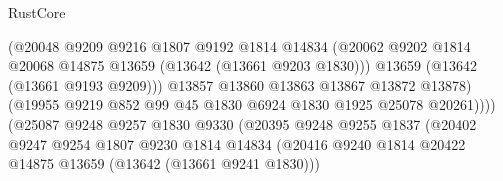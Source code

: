 \begin{lexlean}{RustCore}
\begin{coremodule}
                                        (@20048
                                          @9209
                                          @9216
                                          @1807
                                          @9192
                                          @1814
                                          @14834
                                          (@20062
                                            @9202
                                            @1814
                                            @20068
                                            @14875
                                            @13659
                                            (@13642 (@13661 @9203 @1830)))
                                          @13659
                                          (@13642 (@13661 @9193 @9209)))
                                        @13857
                                        @13860
                                        @13863
                                        @13867
                                        @13872
                                        @13878)
                                      (@19955
                                        @9219
                                        @852
                                        @99
                                        @45
                                        @1830
                                        @6924
                                        @1830
                                        @1925
                                        @25078
                                        @20261))))
                                (@25087
                                  @9248
                                  @9257
                                  @1830
                                  @9330
                                  (@20395
                                    @9248
                                    @9255
                                    @1837
                                    (@20402
                                      @9247
                                      @9254
                                      @1807
                                      @9230
                                      @1814
                                      @14834
                                      (@20416
                                        @9240
                                        @1814
                                        @20422
                                        @14875
                                        @13659
                                        (@13642 (@13661 @9241 @1830)))

\end{coremodule}
\end{lexlean}
